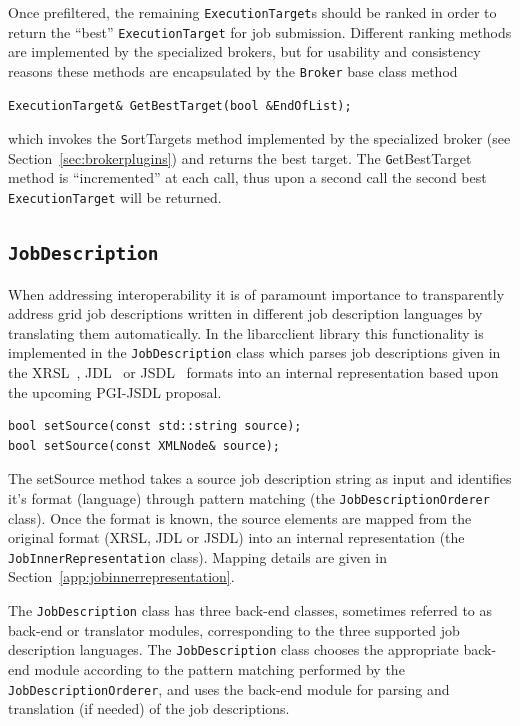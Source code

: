 \documentclass{book}
\newcommand{\libarcclient}{libarcclient}
\newcommand{\Broker}{\texttt{Broker}}
\newcommand{\ExecutionTarget}{\texttt{ExecutionTarget}}
\newcommand{\JobDescription}{\texttt{JobDescription}}
\begin{document}
Once prefiltered, the remaining {\ExecutionTarget}s should be ranked in order to return the ``best'' {\ExecutionTarget} for 
job submission. Different ranking methods are implemented by the specialized brokers, but for usability and consistency reasons 
these methods are encapsulated by the {\Broker} base class method

\begin{shaded}
\begin{verbatim}
ExecutionTarget& GetBestTarget(bool &EndOfList);
\end{verbatim}
\end{shaded}

which invokes the {\texttt SortTargets} method implemented by the specialized broker (see Section~\ref{sec:brokerplugins}) 
and returns the best target. The {\texttt GetBestTarget} method is ``incremented'' at each call, thus upon a second call 
the second best {\ExecutionTarget} will be returned. 

\subsection{{\JobDescription}}

When addressing interoperability it is of paramount importance to
transparently address grid job descriptions written in different job
description languages by translating them automatically. In the
{\libarcclient} library this functionality is implemented in the
{\JobDescription} class which parses job descriptions given in the 
XRSL~\cite{xrsl}, JDL~\cite{jdl} or JSDL~\cite{jsdl} formats into an 
internal representation based upon the upcoming PGI-JSDL proposal.

\begin{shaded}
\begin{verbatim}
bool setSource(const std::string source);
bool setSource(const XMLNode& source);
\end{verbatim}
\end{shaded}

The setSource method takes a source job description string as input and identifies it's format 
(language) through pattern matching (the \texttt{JobDescriptionOrderer} class).
Once the format is known, the source elements are mapped from the original format (XRSL, JDL or JSDL) 
into an internal representation (the \texttt{JobInnerRepresentation} class). Mapping details 
are given in Section~\ref{app:jobinnerrepresentation}. 

The {\JobDescription} class has three back-end classes, sometimes
referred to as back-end or translator modules, corresponding to the
three supported job description languages. The {\JobDescription} class
chooses the appropriate back-end module according to the pattern matching
performed by the \texttt{JobDescriptionOrderer}, and uses the back-end
module for parsing and translation (if needed) of the job descriptions.
\end{document}
